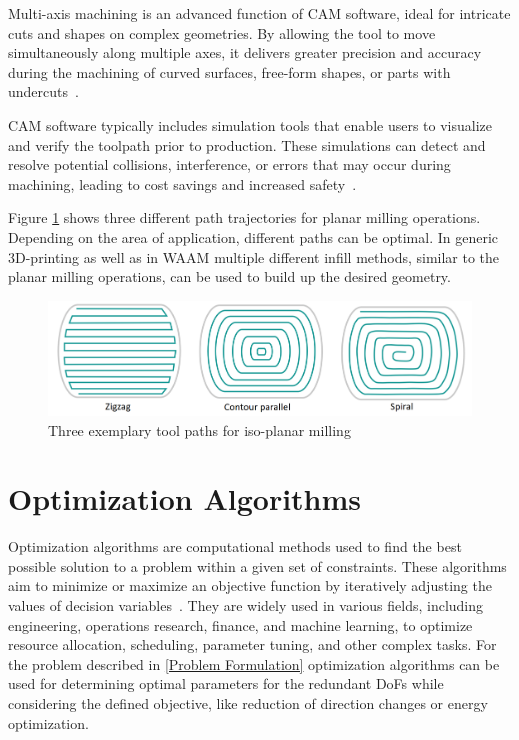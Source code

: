 Multi-axis machining is an advanced function of \acrshort{CAM} software, ideal for intricate cuts and shapes on complex geometries. By allowing the tool to move simultaneously along multiple axes, it delivers greater precision and accuracy during the machining of curved surfaces, free-form shapes, or parts with undercuts~\cite{Takeuchi.2014}.

\acrshort{CAM} software typically includes simulation tools that enable users to visualize and verify the toolpath prior to production. These simulations can detect and resolve potential collisions, interference, or errors that may occur during machining, leading to cost savings and increased safety~\cite{Dubovska.2014}. 

Figure \ref{3path} shows three different path trajectories for planar milling operations. Depending on the area of application, different paths can be optimal. In generic 3D-printing as well as in \acrshort{WAAM} multiple different infill methods, similar to the planar milling operations, can be used to build up the desired geometry.  

\begin{figure}[H]
	\centerline{\includegraphics[scale=.35]{figures/path.png}}
	\caption{Three exemplary tool paths for iso-planar milling~\cite{Zhao.2018}}
	\label{3path}
\end{figure}

\section{Optimization Algorithms}%

Optimization algorithms are computational methods used to find the best possible solution to a problem within a given set of constraints. These algorithms aim to minimize or maximize an objective function by iteratively adjusting the values of decision variables~\cite{Sivanandam.2007b}. They are widely used in various fields, including engineering, operations research, finance, and machine learning, to optimize resource allocation, scheduling, parameter tuning, and other complex tasks. For the problem described in \ref{Problem Formulation} optimization algorithms can be used for determining optimal parameters for the redundant \acrshort{DoF}s while considering the defined objective, like reduction of direction changes or energy optimization. 


